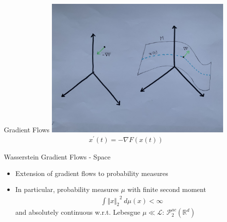 \documentclass[aspectratio=149]{beamer}
\def\real{\mathbb{R}}
\newcommand{\norm}[2]{\ensuremath{\Vert #1 \Vert_{#2}}}
\begin{document}
\begin{frame}{Gradient Flows}
\centering
\includegraphics[width=0.7\textwidth]{gf}
\begin{align*}
x^\prime(t)=-\nabla F(x(t))
\end{align*}
\end{frame}

\begin{frame}{Wasserstein Gradient Flows - Space}
\begin{itemize}
\item Extension of gradient flows to probability measures
\item In particular, probability measures $\mu$ with finite second moment
\begin{align*}
\int\norm{x}{2}^{2}\ d\mu(x)<\infty
\end{align*}
and absolutely continuous w.r.t. Lebesgue $\mu\ll\mathcal{L}$: $\mathcal{P}_{2}^{ac}(\real^{d})$
\end{itemize}
\end{frame}
\end{document}
